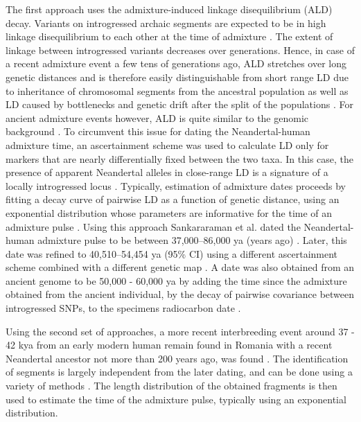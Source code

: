 \documentclass[]{article}
\begin{document}
The first approach uses the admixture-induced linkage disequilibrium (ALD) decay. Variants on introgressed archaic segments are expected to be in high linkage disequilibrium to each other at the time of admixture \citep{chakraborty_admixture_1988,stephens_mapping_1994,wall_detecting_2000}. The extent of linkage between introgressed variants decreases over generations. Hence, in case of a recent admixture event a few tens of generations ago, ALD stretches  over long genetic distances
\citep{patterson_methods_2004} and is therefore easily distinguishable from short range LD due to inheritance of chromosomal segments from the ancestral population as well as LD caused by bottlenecks and genetic drift after the split of the populations \citep{moorjani_history_2011,sankararaman_date_2012}. For ancient admixture events however, ALD is quite similar to the genomic background \citep{sankararaman_date_2012}. To circumvent this issue for dating the Neandertal-human admixture time, an ascertainment scheme was used to calculate LD only for markers that are nearly differentially fixed between the two taxa. In this case, the presence of apparent Neandertal alleles in close-range LD is a signature of a locally introgressed locus
\citep{sankararaman_date_2012}. Typically, estimation of admixture dates proceeds by fitting a decay curve of pairwise LD as a function of genetic distance, using an exponential distribution whose parameters are informative for the time of an admixture pulse \citep{moorjani_history_2011,loh_inferring_2013}. Using this approach Sankararaman et al. dated the Neandertal-human admixture pulse to be  between 37,000--86,000 ya (years ago) \citep{sankararaman_date_2012}. Later, this date was refined to 40,510--54,454 ya (95\% CI) using a different ascertainment scheme combined with a different genetic map \citep{moorjani_genetic_2016}. A date was also obtained from an ancient genome to be 50,000 - 60,000 ya by adding the time since the admixture obtained from the ancient individual, by the decay of pairwise covariance between
introgressed SNPs, to the specimens radiocarbon date \citep{fu_genome_2014}.

Using the second set of approaches, a more recent interbreeding event around 37 - 42 kya from an early modern human remain found in Romania with a recent Neandertal ancestor not more than 200 years ago, was found \citep{fu_early_2015}. The identification of segments is largely independent from the later dating, and can be done using a variety of methods \citep{racimo_signatures_2017,seguin_orlando_paleogenomics_2014,vernot_excavating_2016,sankararaman_combined_2016,skov_detecting_2018}. The length distribution of the obtained fragments is then used to estimate the time of the admixture pulse, typically using an exponential distribution.
\end{document}
